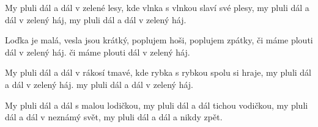 
\beginverse{}
My pluli dál a dál v zelené lesy,
kde vlnka s vlnkou slaví své plesy,
my pluli dál a dál v zelený háj,
my pluli dál a dál v zelený háj.
\endverse{}

\beginverse{}
Loďka je malá, vesla jsou krátký,
poplujem hoši, poplujem zpátky,
či máme plouti dál v zelený háj.
či máme plouti dál v zelený háj.
\endverse{}

\beginverse{}
My pluli dál a dál v rákosí tmavé,
kde rybka s rybkou spolu si hraje,
my pluli dál a dál v zelený háj.
my pluli dál a dál v zelený háj.
\endverse{}

\beginverse{}
My pluli dál a dál s malou lodičkou,
my pluli dál a dál tichou vodičkou,
my pluli dál a dál v neznámý svět,
my pluli dál a dál a nikdy zpět.
\endverse{}

\endsong{}
